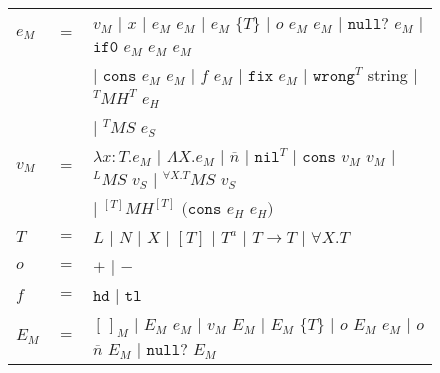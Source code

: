 \begin{figure}[p]
\centering
\begin{tabular}{lcl}
\vspace{5pt}

$e_{M}$ & $=$ & $v_{M}$ $\vert$ $x$ $\vert$ $e_{M}$ $e_{M}$ $\vert$ $e_{M}$ $\lbrace T\rbrace$ $\vert$ $o$ $e_{M}$ $e_{M}$ $\vert$ $\mathtt{null?}$ $e_{M}$ $\vert$ $\mathtt{if0}$ $e_{M}$ $e_{M}$ $e_{M}$ \\

\vspace{5pt}

&& $\vert$ $\mathtt{cons}$ $e_{M}$ $e_{M}$ $\vert$ $f$ $e_{M}$ $\vert$ $\mathtt{fix}$ $e_{M}$ $\vert$ $\mathtt{wrong}^{T}$ string $\vert$ $^{T}MH^{T}$ $e_{H}$ \\

\vspace{5pt}

&& $\vert$ $^{T}MS$ $e_{S}$ \\

\vspace{5pt}

$v_{M}$ & $=$ & $\lambda x:T.e_{M}$ $\vert$ $\Lambda X.e_{M}$ $\vert$ $\overline{n}$ $\vert$ $\mathtt{nil}^{T}$ $\vert$ $\mathtt{cons}$ $v_{M}$ $v_{M}$ $\vert$ $^{L}MS$ $v_{S}$ $\vert$ $^{\forall X.T}MS$ $v_{S}$ \\

\vspace{5pt}

&& $\vert$ $^{[T]}MH^{[T]}$ $(\mathtt{cons}$ $e_{H}$ $e_{H})$ \\

\vspace{5pt}

$T$ & $=$ & $L$ $\vert$ $N$ $\vert$ $X$ $\vert$ $[T]$ $\vert$ $T^{a}$ $\vert$ $T\rightarrow T$ $\vert$ $\forall X.T$ \\

\vspace{5pt}

$o$ & $=$ & $+$ $\vert$ $-$ \\

\vspace{5pt}

$f$ & $=$ & $\mathtt{hd}$ $\vert$ $\mathtt{tl}$ \\

\vspace{5pt}

$E_{M}$ & $=$ & $[\,]_{M}$ $\vert$ $E_{M}$ $e_{M}$ $\vert$ $v_{M}$ $E_{M}$ $\vert$ $E_{M}$ $\lbrace T\rbrace$ $\vert$ $o$ $E_{M}$ $e_{M}$ $\vert$ $o$ $\overline{n}$ $E_{M}$ $\vert$ $\mathtt{null?}$ $E_{M}$ \\


\end{tabular}
\end{figure}
